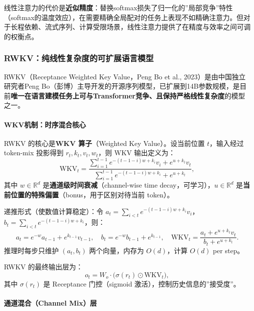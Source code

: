 \documentclass[12pt,a4paper]{article}
\begin{document}
线性注意力的代价是\textbf{近似精度}：替换softmax损失了归一化的”局部竞争”特性（softmax的温度效应），在需要精确全局配对的任务上表现不如精确注意力。但对于长程依赖、流式序列、计算受限场景，线性注意力提供了在精度与效率之间可调的权衡点。

\subsubsection{RWKV：纯线性复杂度的可扩展语言模型}
\label{sec:rwkv}

RWKV（Receptance Weighted Key Value，Peng Bo et al., 2023）是由中国独立研究者Peng Bo（彭博）主导开发的开源序列模型，已扩展到14B参数规模，是目前\textbf{唯一在语言建模任务上可与Transformer竞争、且保持严格线性复杂度}的模型之一。

\paragraph{WKV机制：时序混合核心}

RWKV 的核心是\textbf{WKV 算子}（Weighted Key Value）。设当前位置 $t$，输入经过 token-mix 投影得到 $r_t, k_t, v_t, w_t$，则 WKV 输出定义为：
\begin{equation}
\mathrm{WKV}_t = \frac{\sum_{i=1}^{t-1} e^{-(t-1-i)w + k_i} v_i + e^{u + k_t} v_t}{\sum_{i=1}^{t-1} e^{-(t-1-i)w + k_i} + e^{u + k_t}},
\end{equation}
其中 $w \in \mathbb{R}^d$ 是\textbf{通道级时间衰减}（channel-wise time decay，可学习），$u \in \mathbb{R}^d$ 是\textbf{当前位置的特殊偏置}（bonus，用于区别对待当前 token）。

递推形式（使数值计算稳定）：令 $a_t = \sum_{i<t} e^{-(t-1-i)w+k_i} v_i$，$b_t = \sum_{i<t} e^{-(t-1-i)w+k_i}$，则：
\begin{equation}
a_t = e^{-w} a_{t-1} + e^{k_{t-1}} v_{t-1},\quad
b_t = e^{-w} b_{t-1} + e^{k_{t-1}},\quad
\mathrm{WKV}_t = \frac{a_t + e^{u+k_t} v_t}{b_t + e^{u+k_t}}.
\end{equation}
推理时每步只维护 $(a_t, b_t)$ 两个向量，内存为 $O(d)$，计算 $O(d)$ per step。

RWKV 的最终输出层为：
\begin{equation}
o_t = W_o \cdot \bigl(\sigma(r_t) \odot \mathrm{WKV}_t\bigr),
\end{equation}
其中 $\sigma(r_t)$ 是 Receptance 门控（sigmoid 激活），控制历史信息的”接受度”。

\paragraph{通道混合（Channel Mix）层}
\end{document}

